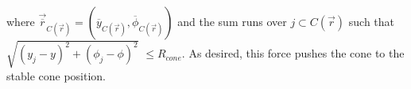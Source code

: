 \documentclass[12pt]{iopart}
\begin{document}
%
where $\overrightarrow{\overline{r}}_{C(  \overrightarrow{r})
}=\left(  \overline{y}_{C(  \overrightarrow{r})  },\overline{\phi
}_{C(  \overrightarrow{r}) }\right)$ and the sum runs over
$j\subset C(\overrightarrow{r})$ such that $\sqrt{\left(  y_{j}-y\right)
^{2}+\left(  \phi_{j}-\phi\right)  ^{2}}$ $\leq R_{cone}$.
As desired, this force pushes the cone to the stable cone position.



%



\end{document}

